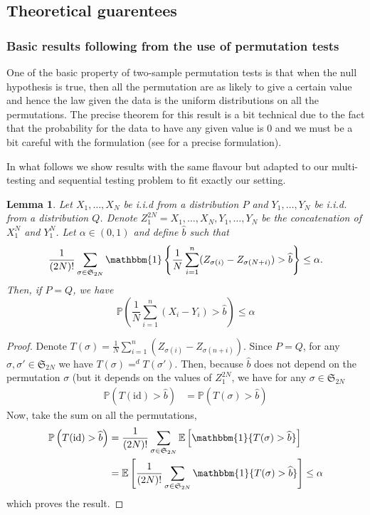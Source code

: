 \documentclass{article}
\theoremstyle{plain}
\newtheorem{Lemma}{Lemma}
\theoremstyle{remark}
\renewcommand{\P}{\mathbb{P}}
\newcommand{\E}{\mathbb{E}}
\renewcommand{\S}{\mathfrak{S}}
\newcommand{\1}{\mathbbm{1}}
\newcommand{\id}{\mathrm{id}}
\newcommand{\todoT}[1]{\todo[inline,color=blue!40]{{\textbf{T:}~}#1}}
\numberwithin{equation}{section}
\begin{document}
\newpage

\subsection{Theoretical guarentees}
\subsubsection{Basic results following from the use of permutation tests}
One of the basic property of two-sample permutation tests is that when the null hypothesis is true, then all the permutation are as likely to give a certain value and hence the law given the data is the uniform distributions on all the permutations. The precise theorem for this result is a bit technical due to the fact that the probability for the data to have any given value is $0$ and we must be a bit careful with the formulation (see \cite[Theorem 17.2.2]{lehmann2005testing} for a precise formulation). 

In what follows we show results with the same flavour but adapted to our multi-testing and sequential testing problem to fit exactly our setting.
\begin{Lemma}\label{lem:quantile_permu_2}
Let $X_1,\dots,X_N$ be i.i.d from a distribution $P$ and $Y_1,\dots,Y_N$ be i.i.d. from a distribution $Q$. Denote $Z_1^{2N}=X_1,\dots,X_N,Y_1,\dots,Y_N$ be the concatenation of $X_1^N$ and $Y_1^N$. Let $\alpha \in (0,1)$ and define $\widehat{b}$ such that 
$$ \frac{1}{(2N)!}\sum_{\sigma\in \S_{2N}} \1\left\{ \frac{1}{N}\sum_{i=1}^n (Z_{\sigma(i)}-Z_{\sigma(N+i)}) > \widehat{b}\right\}\le \alpha.$$
Then, if $P=Q$, we have 
$$\P\left(\frac{1}{N}\sum_{i=1}^n (X_i-Y_i) >\widehat{b} \right)\le \alpha $$ 
\end{Lemma}
\begin{proof}
Denote $T(\sigma)= \frac{1}{N}\sum_{i=1}^n (Z_{\sigma(i)}-Z_{\sigma(n+i)})$. Since $P=Q$, for any $\sigma,\sigma' \in \S_{2N}$ we have $T(\sigma)=^d T(\sigma')$. Then, because $\widehat{b}$ does not depend on the permutation $\sigma$ (but it depends on the values of $Z_1^{2N}$, we have for any $\sigma \in \S_{2N}$
\begin{align*}
\P\left(T(\id)> \widehat{b}\right)&=\P\left(T(\sigma)> \widehat{b}\right)
\end{align*} 
Now, take the sum on all the permutations, 
\begin{align*}
\P\left(T(\id)> \widehat{b}\right)&=\frac{1}{(2N)!}\sum_{\sigma\in \S_{2N}} \E\left[\1\{T(\sigma)> \widehat{b}\}\right]\\
&=  \E\left[\frac{1}{(2N)!}\sum_{\sigma\in \S_{2N}}\1\{T(\sigma)> \widehat{b}\}\right]\le \alpha
\end{align*}
which proves the result.
\end{proof}
\end{document}
